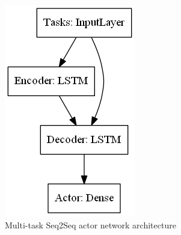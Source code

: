 \begin{figure}[H]
    \centering
    \begin{minipage}{0.45\linewidth}
        \centering
        \includegraphics[width=\linewidth]{figures/3_solution_figs/multi_task_actor_weighting_network_architecture.png}
        \caption{Multi-task Seq2Seq actor network architecture}
        \label{fig:seq2seq-actor-network-architecture}
    \end{minipage}\hfill
    \begin{minipage}{0.55\linewidth}
        \centering

\end{minipage}
\end{figure}
